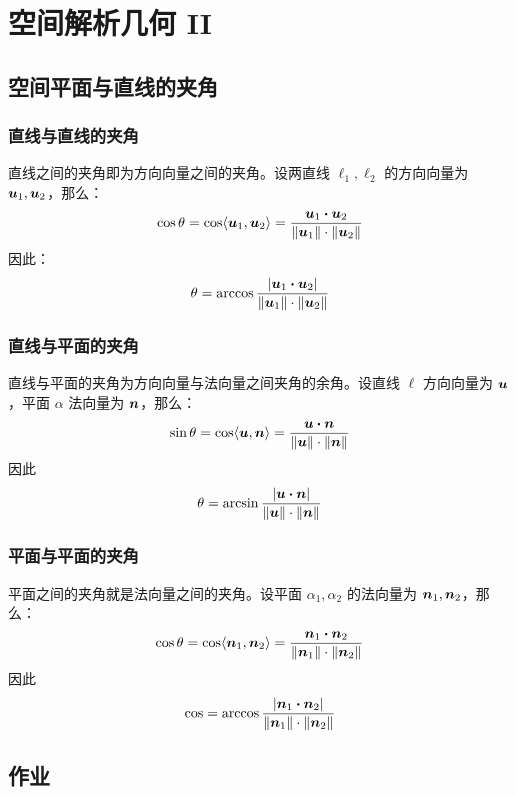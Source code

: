 \section{空间解析几何 II}

\subsection{空间平面与直线的夹角}

\subsubsection{直线与直线的夹角}

直线之间的夹角即为方向向量之间的夹角。设两直线 $\ell_1, \ell_2$ 的方向向量为 $\boldsymbol{u}_1, \boldsymbol{u}_2$，那么：
$$
\cos \theta = \cos \langle \vect{u}_1, \vect{u}_2 \rangle = \frac{\vect{u}_1 \vdot \vect{u}_2}{\norm{\vect{u}_1} \cdot \norm{\vect{u}_2}}
$$
因此：
$$
\theta = \arccos \frac{\abs{\vect{u}_1 \vdot \vect{u}_2}}{\norm{\vect{u}_1} \cdot \norm{\vect{u}_2}}
$$

\subsubsection{直线与平面的夹角}

直线与平面的夹角为方向向量与法向量之间夹角的余角。设直线 $\ell$ 方向向量为 $\boldsymbol{u}$，平面 $\alpha$ 法向量为 $\boldsymbol{n}$，那么：
$$
\sin \theta = \cos \langle \vect{u}, \vect{n} \rangle = \frac{\vect{u} \vdot \vect{n}}{\norm{\vect{u}} \cdot \norm{\vect{n}}}
$$
因此
$$
\theta = \arcsin \frac{\abs{\vect{u} \vdot \vect{n}}}{\norm{\vect{u}} \cdot \norm{\vect{n}}}
$$

\subsubsection{平面与平面的夹角}

平面之间的夹角就是法向量之间的夹角。设平面 $\alpha_1, \alpha_2$ 的法向量为 $\boldsymbol{n}_1, \boldsymbol{n}_2$，那么：
$$
\cos \theta = \cos \langle \vect{n}_1, \vect{n}_2 \rangle = \frac{\vect{n}_1 \vdot \vect{n}_2}{\norm{\vect{n}_1} \cdot \norm{\vect{n}_2}}
$$
因此
$$
\cos = \arccos \frac{\abs{\vect{n}_1 \vdot \vect{n}_2}}{\norm{\vect{n}_1} \cdot \norm{\vect{n}_2}}
$$

\subsection{作业}

